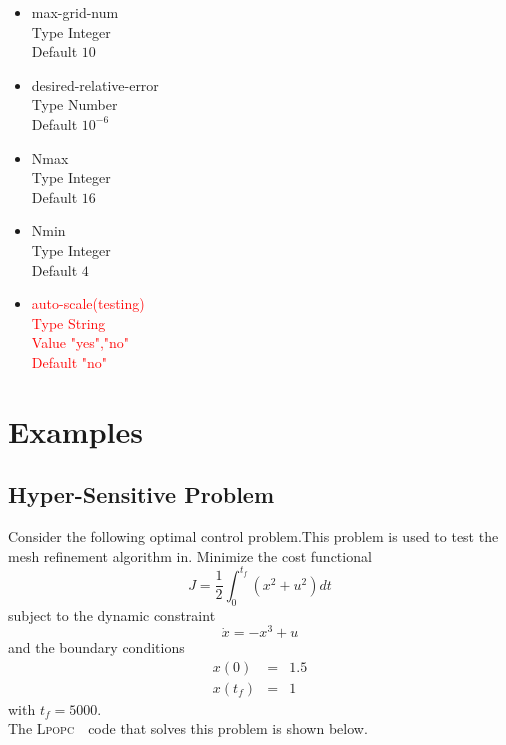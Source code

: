 \documentclass[10pt]{article}
\newcommand{\LPOPC}{\textsc{Lpopc}\xspace}
\begin{document}
\begin{itemize}
	 	\item max-grid-num\\
	 	Type Integer\\
	 	Default $10$
	 	
	 	\item desired-relative-error\\
	 	Type Number\\
	 	Default $10^{-6}$
	 	
	 	\item Nmax\\
	 	Type Integer\\
	 	Default $16$
	 	
	 	\item Nmin\\
	 	Type Integer\\
	 	Default $4$
	 	
	 	\item \textcolor{red}{auto-scale(testing)\\
	 	Type String\\
	 	Value "yes","no"\\
	 	Default "no"
	 }
	 \end{itemize}	
\section{Examples}
	\subsection{Hyper-Sensitive Problem}
	Consider the following optimal control problem\cite{rao2000}.This problem is used to test the mesh refinement algorithm in\cite{Patterson2014a}.  Minimize the cost functional
	\begin{equation}
	J = \textstyle\frac{1}{2}\displaystyle \int_0^{t_f} \left( x^2 + u^2 \right) dt
	\end{equation}
	subject to the dynamic constraint
	\begin{equation}
	\dot{x} = -x^3 + u
	\end{equation}
	and the boundary conditions
	\begin{equation}
	\begin{array}{lcl}
	x(0) & = & 1.5 \\
	x(t_f) & = & 1
	\end{array}
	\end{equation}
	with $t_f=5000$.\\
	The \LPOPC　code that solves this problem is shown below.\\
	
	
\end{document}
